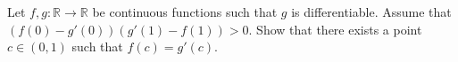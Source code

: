 Let $f,g:\mathbb R\to\mathbb R$ be continuous functions such that $g$ is differentiable. Assume that $(f(0)-g'(0))(g'(1)-f(1))>0$. Show that there exists a point $c\in (0,1)$ such that $f(c)=g'(c)$.

